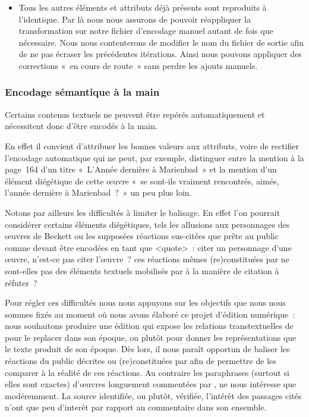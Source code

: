 \documentclass[12pt, a4paper]{article}
\begin{document}
\begin{itemize}
    \item Tous les autres éléments et attributs déjà présents sont reproduits à l'identique. Par là nous nous assurons de pouvoir réappliquer la transformation sur notre fichier d'encodage manuel autant de fois que nécessaire. Nous nous contenterons de modifier le nom du fichier de sortie afin de ne pas écraser les précédentes itérations. Ainsi nous pouvons appliquer des corrections «~en cours de route~» sans perdre les ajouts manuels.
\end{itemize}


\subsubsection{Encodage sémantique à la main}
Certains contenus textuels ne peuvent être repérés automatiquement et nécessitent donc d'être encodés à la main.

En effet il convient d'attribuer les bonnes valeurs aux attributs, voire de rectifier l'encodage automatique qui ne peut, par exemple, distinguer entre la mention à la page~164 d'un titre «~L'Année dernière à Marienbad~» et la mention d'un élément diégétique de cette œuvre «~se sont-ils vraiment rencontrés, aimés, l’année dernière à Marienbad~?~» un peu plus loin.

Notons par ailleurs les difficultés à limiter le balisage. En effet l'on pourrait considérer certains éléments diégétiques, tels les allusions aux personnages des œuvres de Beckett ou les supposées réactions sus-citées que \robbe{} prête au public comme devant être encodées en tant que <quote>~: citer un personnage d'une œuvre, n'est-ce pas citer l'œuvre~? ces réactions mêmes (re)constituées par \robbe{} ne sont-elles pas des éléments textuels mobilisés par \robbe{} à la manière de citation à réfuter~?

Pour régler ces difficultés nous nous appuyons sur les objectifs que nous nous sommes fixés au moment où nous avons élaboré ce projet d'édition numérique~: nous souhaitons produire une édition qui expose les relations transtextuelles de \punr{} pour le replacer dans son époque, ou plutôt pour donner les représentations que le texte produit de son époque. Dès lors, il nous paraît opportun de baliser les réactions du public décrites ou (re)constituées par \robbe{} afin de permettre de les comparer à la réalité de ces réactions. Au contraire les paraphrases (surtout si elles sont exactes) d'œuvres longuement commentées par \robbe, ne nous intéresse que modéremment. La source identifiée, ou plutôt, vérifiée, l'intérêt des passages cités n'ont que peu d'interêt par rapport au commentaire dans son ensemble.
\end{document}
